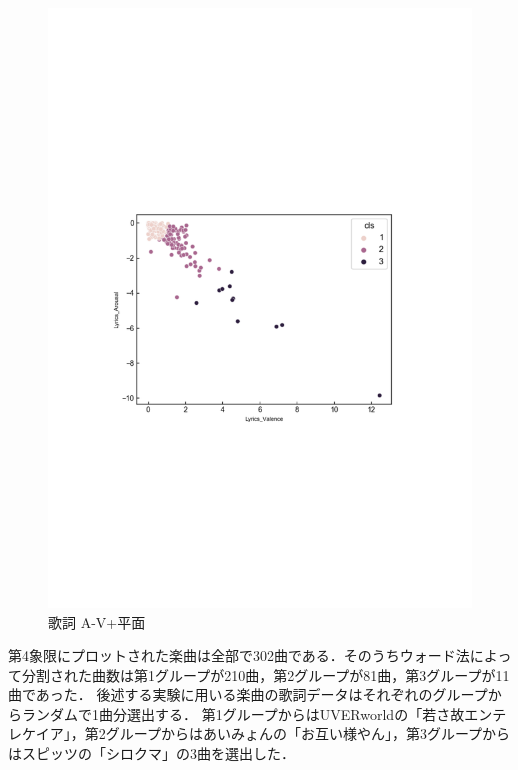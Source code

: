 \begin{figure}[H]
  \centering
  \includegraphics[width=14cm]{lyrics_A-V+.pdf}
  \vspace{-1mm}
  \caption{歌詞 A-V+平面}
  \label{fig:vkall}
  \vspace{5mm}
\end{figure}
第4象限にプロットされた楽曲は全部で302曲である．そのうちウォード法によって分割された曲数は第1グループが210曲，第2グループが81曲，第3グループが11曲であった．
後述する実験に用いる楽曲の歌詞データはそれぞれのグループからランダムで1曲分選出する．
第1グループからはUVERworldの「若さ故エンテレケイア」，第2グループからはあいみょんの「お互い様やん」，第3グループからはスピッツの「シロクマ」の3曲を選出した．
\newpage
